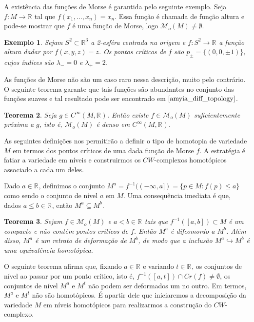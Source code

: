 \documentclass[12pt]{book}
\newtheorem{teorema}{Teorema}[section]
\newtheorem{exemplo}[teorema]{Exemplo}
\newcommand{\funcoesmorse}[1]{\mathcal{M}_{o}(#1)}
\newcommand{\funcoessuaves}[1]{C^{\infty}(#1, \real{})}
\newcommand{\pontoscriticos}[1]{\textit{Cr}(#1)}
\newcommand{\real}[1]{\mathbb{R}^{#1}}
\newcommand{\reta}{\real{}}
\begin{document}
	A existência das funções de Morse é garantida pelo seguinte exemplo. Seja $f:M\to \reta$ tal que $f(x_{1}, \dots, x_{n}) = x_{n}$. Essa função é chamada de função altura e pode-se mostrar que $f$ é uma função de Morse, logo $\funcoesmorse{M} \neq \emptyset$.
	
	\begin{exemplo}
		Sejam $S^{2} \subset \real{3}$ a 2-esféra centrada na origem e $f:S^{2}\to \reta$ a função altura dadar por $f(x,y,z) = z$. Os pontos críticos de $f$ são $p_{\pm} = \{(0,0,\pm 1)\}$, cujos índices são $\lambda_{- } = 0$ e $\lambda_{+ } = 2$.
	\end{exemplo}
	
	As funções de Morse não são um caso raro nessa descrição, muito pelo contrário. O seguinte teorema garante que tais funções são abundantes no conjunto das funções suaves e tal resultado pode ser encontrado em $\cite{amyia_diff_topology}$.
	
	\begin{teorema}
		Seja $g\in \funcoessuaves{M}$. Então existe $f \in \funcoesmorse{M}$ suficientemente próxima a $g$, isto é, $\funcoesmorse{M}$ é denso em $\funcoessuaves{M}$.
	\end{teorema} 
	
	As seguintes definições nos permitirão a definir o tipo de homotopia de variedade $M$ em termos dos pontos críticos de uma dada função de Morse $f$. A estratégia é fatiar a variedade em níveis e construirmos os $CW$-complexos homotópicos associado a cada um deles.
	
	Dado $a \in \reta$, definimos o conjunto $M^{a}= f^{-1}((-\infty, a]) = \{p \in M: f(p)\leq a\}$ como sendo o conjunto de nível $a$ em $M$. Uma consequência imediata é que, dados $a\leq b \in \reta$, então $M^{a} \subseteq M^{b}$.
	
	\begin{teorema}
		Sejam $f \in \funcoesmorse{M}$ e $a<b \in \reta$ tais que $f^{-1}([a,b])\subset M$ é um compacto e não contém pontos críticos de $f$. Então $M^{a}$ é difeomordo a $M^{b}$. Além disso, $M^{a}$ é um retrato de deformação de $M^{b}$, de modo que a inclusão  $M^{a} \hookrightarrow M^{b}$ é uma equivalência homotópica.
	\end{teorema}
	
	O seguinte teorema afirma que, fixando $a \in \reta$ e variando $t \in \reta$, os conjuntos de nível ao passar por um ponto crítico, isto é, $f^{-1}([a,t]) \cap \pontoscriticos{f} \neq \emptyset$, os conjuntos de nível $M^{a}$ e $M^{t}$ não podem ser deformados um no outro. Em termos,  $M^{a}$ e $M^{t}$ não são homotópicos. É apartir dele que iniciaremos a decomposição da variedade $M$ em níveis homotópicos para realizarmos a construção do $CW$-complexo.
	
\end{document}
